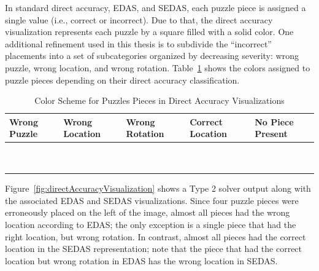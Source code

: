\documentclass{report}
\begin{document}
In standard direct accuracy, EDAS, and SEDAS, each puzzle piece is assigned a single value (i.e., correct or incorrect).  Due to that, the direct accuracy visualization represents each puzzle by a square filled with a solid color.  One additional refinement used in this thesis is to subdivide the ``incorrect'' placements into a set of subcategories organized by decreasing severity: wrong puzzle, wrong location, and wrong rotation.  Table~\ref{tab:directAccuracyColors} shows the colors assigned to puzzle pieces depending on their direct accuracy classification.

\begin{table}[h]
	\begin{center}
  		\begin{tabular}{ | >{\centering\arraybackslash}m{0.6in} | >{\centering\arraybackslash}m{0.6in} | >{\centering\arraybackslash}m{0.6in} | >{\centering\arraybackslash}m{0.6in} | >{\centering\arraybackslash}m{0.6in} | }
 \hline
    		Wrong Puzzle & Wrong Location & Wrong Rotation & Correct Location  & No Piece Present  \\ \hline
			{\cellcolor{blue}~} & {\cellcolor{red}~}  & {\cellcolor{orange}~}  & {\cellcolor{green}~} & {\cellcolor{black}~}  \\
			{\cellcolor{blue}~} & {\cellcolor{red}~}  & {\cellcolor{orange}~}  & {\cellcolor{green}~} & {\cellcolor{black}~} \\
 \hline
		\end{tabular}
	\end{center}
\caption{Color Scheme for Puzzles Pieces in Direct Accuracy Visualizations}\label{tab:directAccuracyColors}
\end{table}

Figure~\ref{fig:directAccuracyVisualization} shows a Type 2 solver output along with the associated EDAS and SEDAS visualizations. Since four puzzle pieces were erroneously placed on the left of the image, almost all pieces had the wrong location according to EDAS; the only exception is a single piece that had the right location, but wrong rotation.  In contrast, almost all pieces had the correct location in the SEDAS representation; note that the piece that had the correct location but wrong rotation in EDAS has the wrong location in SEDAS.
\end{document}
